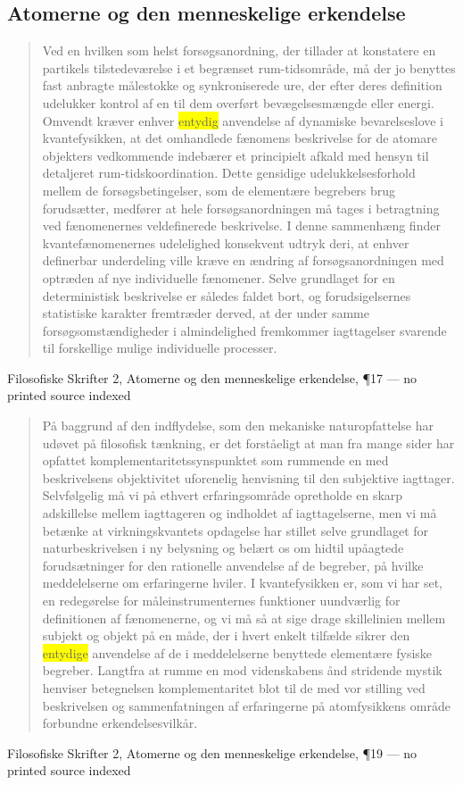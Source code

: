 \documentclass[11pt]{article}
\newcommand{\dcite}[1]{{\nopagebreak\raggedleft\small #1\par}\medskip}
\newcommand{\tlg}[1]{{\setlength{\fboxsep}{0.8pt}\colorbox{yellow}{#1}}}
\begin{document}
\subsection{Atomerne og den menneskelige erkendelse}

\begin{quote}
Ved en hvilken som helst forsøgsanordning, der tillader at konstatere en partikels tilstedeværelse i et begrænset rum-tidsområde, må der jo benyttes fast anbragte målestokke og synkroniserede ure, der efter deres definition udelukker kontrol af en til dem overført bevægelsesmængde eller energi. Omvendt kræver enhver \tlg{entydig} anvendelse af dynamiske bevarelseslove i kvantefysikken, at det omhandlede fænomens beskrivelse for de atomare objekters vedkommende indebærer et principielt afkald med hensyn til detaljeret rum-tidskoordination. Dette gensidige udelukkelsesforhold mellem de forsøgsbetingelser, som de elementære begrebers brug forudsætter, medfører at hele forsøgsanordningen må tages i betragtning ved fænomenernes veldefinerede beskrivelse. I denne sammenhæng finder kvantefænomenernes udelelighed konsekvent udtryk deri, at enhver definerbar underdeling ville kræve en ændring af forsøgsanordningen med optræden af nye individuelle fænomener. Selve grundlaget for en deterministisk beskrivelse er således faldet bort, og forudsigelsernes statistiske karakter fremtræder derved, at der under samme forsøgsomstændigheder i almindelighed fremkommer iagttagelser svarende til forskellige mulige individuelle processer.
\end{quote}
\dcite{Filosofiske Skrifter 2, Atomerne og den menneskelige erkendelse, ¶17 — no printed source indexed}

\begin{quote}
På baggrund af den indflydelse, som den mekaniske naturopfattelse har udøvet på filosofisk tænkning, er det forståeligt at man fra mange sider har opfattet komplementaritetssynspunktet som rummende en med beskrivelsens objektivitet uforenelig henvisning til den subjektive iagttager. Selvfølgelig må vi på ethvert erfaringsområde opretholde en skarp adskillelse mellem iagttageren og indholdet af iagttagelserne, men vi må betænke at virkningskvantets opdagelse har stillet selve grundlaget for naturbeskrivelsen i ny belysning og belært os om hidtil upåagtede forudsætninger for den rationelle anvendelse af de begreber, på hvilke meddelelserne om erfaringerne hviler. I kvantefysikken er, som vi har set, en redegørelse for måleinstrumenternes funktioner uundværlig for definitionen af fænomenerne, og vi må så at sige drage skillelinien mellem subjekt og objekt på en måde, der i hvert enkelt tilfælde sikrer den \tlg{entydige} anvendelse af de i meddelelserne benyttede elementære fysiske begreber. Langtfra at rumme en mod videnskabens ånd stridende mystik henviser betegnelsen komplementaritet blot til de med vor stilling ved beskrivelsen og sammenfatningen af erfaringerne på atomfysikkens område forbundne erkendelsesvilkår.
\end{quote}
\dcite{Filosofiske Skrifter 2, Atomerne og den menneskelige erkendelse, ¶19 — no printed source indexed}
\end{document}
